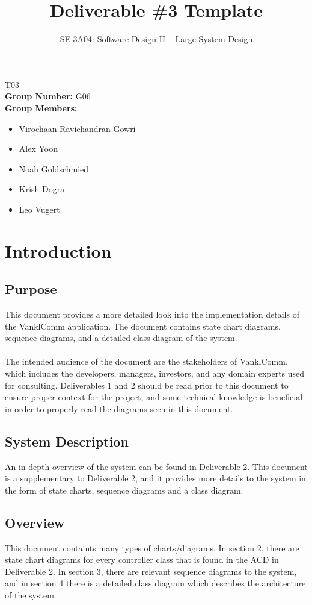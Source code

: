 \documentclass[]{article}
\title{Deliverable \#3 Template}
\author{SE 3A04: Software Design II -- Large System Design}
\date{}
\begin{document}
\maketitle
{} T03\\
{\bf Group Number:} G06 \\
{\bf Group Members:}
\begin{itemize}
	\item Virochaan Ravichandran Gowri
	\item Alex Yoon
	\item Noah Goldschmied
	\item Krish Dogra
	\item Leo Vugert
\end{itemize}

\newpage
\section{Introduction}
\label{sec:introduction}

\subsection{Purpose}
\label{sub:purpose}
This document provides a more detailed look into the implementation details of the VanklComm application. The document contains state chart diagrams, sequence diagrams, and a detailed class diagram of the system. \\
\\The intended audience of the document are the stakeholders of VanklComm, which includes the developers, managers, investors, and any domain experts used for consulting. Deliverables 1 and 2 should be read prior to this document to ensure proper context for the project, and some technical knowledge is beneficial in order to properly read the diagrams seen in this document.

\subsection{System Description}
\label{sub:system_description}
An in depth overview of the system can be found in Deliverable 2. This document is a supplementary to Deliverable 2, and it provides more details to the system in the form of state charts, sequence diagrams and a class diagram.

\subsection{Overview}
\label{sub:overview}
This document containts many types of charts/diagrams. In section 2, there are state chart diagrams for every controller class that is found in the ACD in Deliverable 2. In section 3, there are relevant sequence diagrams to the system, and in section 4 there is a detailed class diagram which describes the architecture of the system.
\end{document}
